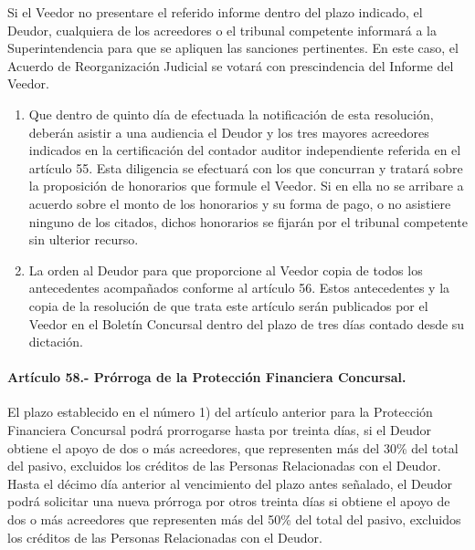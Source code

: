 \documentclass[
]{book}
\begin{document}
Si el Veedor no presentare el referido informe dentro del plazo indicado, el Deudor, cualquiera de los acreedores o el tribunal competente informará a la Superintendencia para que se apliquen las sanciones pertinentes. En este caso, el Acuerdo de Reorganización Judicial se votará con prescindencia del Informe del Veedor.

\begin{enumerate}
\def\labelenumi{\arabic{enumi})}
\setcounter{enumi}{8}
\item
  Que dentro de quinto día de efectuada la notificación de esta resolución, deberán asistir a una audiencia el Deudor y los tres mayores acreedores indicados en la certificación del contador auditor independiente referida en el artículo 55. Esta diligencia se efectuará con los que concurran y tratará sobre la proposición de honorarios que formule el Veedor. Si en ella no se arribare a acuerdo sobre el monto de los honorarios y su forma de pago, o no asistiere ninguno de los citados, dichos honorarios se fijarán por el tribunal competente sin ulterior recurso.
\item
  La orden al Deudor para que proporcione al Veedor copia de todos los antecedentes acompañados conforme al artículo 56. Estos antecedentes y la copia de la resolución de que trata este artículo serán publicados por el Veedor en el Boletín Concursal dentro del plazo de tres días contado desde su dictación.
\end{enumerate}

\hypertarget{artuxedculo-58.--pruxf3rroga-de-la-protecciuxf3n-financiera-concursal.}{%
\paragraph*{Artículo 58.- Prórroga de la Protección Financiera Concursal.}\label{artuxedculo-58.--pruxf3rroga-de-la-protecciuxf3n-financiera-concursal.}}

El plazo establecido en el número 1) del artículo anterior para la Protección Financiera Concursal podrá prorrogarse hasta por treinta días, si el Deudor obtiene el apoyo de dos o más acreedores, que representen más del 30\% del total del pasivo, excluidos los créditos de las Personas Relacionadas con el Deudor. Hasta el décimo día anterior al vencimiento del plazo antes señalado, el Deudor podrá solicitar una nueva prórroga por otros treinta días si obtiene el apoyo de dos o más acreedores que representen más del 50\% del total del pasivo, excluidos los créditos de las Personas Relacionadas con el Deudor.
\end{document}
